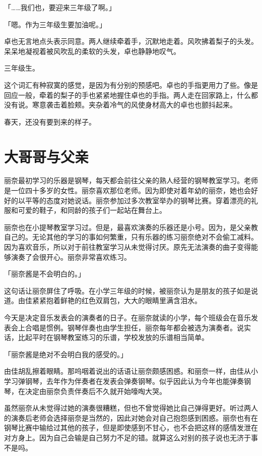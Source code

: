 \documentclass[UTF8]{ctexart}
\begin{document}
    「……我们也，要迎来三年级了啊。」

    「嗯。作为三年级生要加油呢。」

    卓也无言地点头表示同意。两人继续牵着手，沉默地走着。风吹拂着梨子的头发。呆呆地凝视着被风吹乱的柔软的头发，卓也静静地叹气。

    三年级生。

    这个词汇有种寂寞的感觉，是因为有分别的预感吧。卓也的手指更用力了些。像是回应一般，牵着的梨子的手也紧紧地握住卓也的手指。两人走在回家路上，什么都没有说。寒意袭击着脸颊。夹杂着冷气的风使身材高大的卓也也颤抖起来。

    春天，还没有要到来的样子。
    \section{大哥哥与父亲}
    丽奈最初学习的乐器是钢琴，每天都会前往父亲的熟人经营的钢琴教室学习。老师是一位四十多岁的女性。丽奈喜欢那位老师。因为即使对着年幼的丽奈，她也会好好的以平等的态度对她说话。丽奈参加过多次教室举办的钢琴比赛。穿着漂亮的礼服和可爱的鞋子，和同龄的孩子们一起站在舞台上。

    丽奈也在小提琴教室学习过。但是，最喜欢演奏的乐器还是小号。因为，是父亲教自己的。无论其他的学习的事如何繁重，只有乐器的练习丽奈绝对不会偷工减料。因为喜欢音乐，所以对于前往教室学习从未觉得讨厌。原先无法演奏的曲子变得能够演奏了会很开心。丽奈非常喜欢练习。

    「丽奈酱是不会明白的。」

    这句话让丽奈屏住了呼吸。在小学三年级的时候，被丽奈认为是朋友的孩子如是说道。由佳紧紧抱着鲜艳的红色双肩包，大大的眼睛里满含泪水。

    今天是决定音乐发表会的演奏者的日子。在丽奈就读的小学，每个班级会在音乐发表会上合唱是惯例。钢琴伴奏也由学生担任，丽奈每年都会被选为演奏者。说实话，比起平时在钢琴教室练习的乐谱，学校发放的乐谱相当简单。

    「丽奈酱是绝对不会明白我的感受的。」

    由佳胡乱擦着眼睛。那呜咽着说出的话语让丽奈颇感困惑。和丽奈一样，由佳从小学习弹钢琴，去年作为伴奏者在发表会弹奏钢琴。似乎因此认为今年也能弹奏钢琴，在决定由丽奈负责伴奏后不久就开始嚎啕大哭。

    虽然丽奈从未觉得过她的演奏很糟糕，但也不曾觉得她比自己弹得更好。听过两人的演奏后老师会选择丽奈是当然的，因此对她会对自己抱怨感到困惑。丽奈也有在钢琴比赛中输给过其他的孩子，但是即使感到不甘心，也不会把这样的感情发泄在对方身上。因为自己会输是自己努力不足的错。就算这么对别的孩子说也无济于事不是吗。
\end{document}
